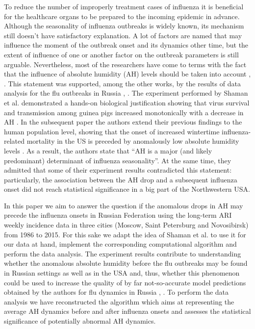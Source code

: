 \documentclass[procedia]{easychair}
\begin{document}
To reduce the number of improperly treatment cases of influenza it is beneficial for the healthcare organs to be prepared to the incoming epidemic in advance.  Although the seasonality of influenza outbreaks is widely known, its mechanism still doesn't have satisfactory explanation. A lot of factors are named that may influence the moment of the outbreak onset and its dynamics other time, but the extent of influence of one or another factor on the outbreak parameters is still  arguable. Nevertheless, most of the researchers have come to terms with the fact that the influence of absolute humidity (AH) levels should be taken into account \cite{tamerius2011global}, \cite{van2012role}. This statement was supported, among the other works, by the results of data analysis for the flu outbreaks in Russia \cite{romanyukha2011origin}, \cite{Leonenko2016}. The experiment performed by Shaman et al. demonstrated a hands-on biological justification showing that virus survival and transmission among guinea pigs increased monotonically with a decrease in AH \cite{shaman2009absolute}. In the subsequent paper the authors extend their previous findings to the human population level, showing that the onset of increased wintertime influenza-related mortality in the US is preceded by anomalously low absolute humidity levels \cite{shaman2010absolute}. As a result, the authors state that ``AH is a major (and likely predominant) determinant of influenza seasonality''. At the same time, they admitted that some of their experiment results contradicted this statement: particularly, the association between the AH drop and a subsequent influenza onset did not reach statistical significance in a big part of the Northwestern USA.

In this paper we aim to answer the question if the anomalous drops in AH may precede the influenza onsets in Russian Federation using the long-term ARI weekly incidence data in three cities (Moscow, Saint Petersburg and Novosibirsk) from 1986 to 2015. For this sake we adapt the idea of Shaman et al. to use it for our data at hand, implement the corresponding computational algorithm and perform the data analysis. The experiment results contribute to understanding whether the anomalous absolute humidity before the flu outbreaks may be found in Russian settings as well as in the USA and, thus, whether this phenomenon could be used to increase the quality of by far not-so-accurate model predictions obtained by the authors for flu dynamics in Russia \cite{leonenko2016mathbio}, \cite{Leon_Novo_Ong}. To perform the data analysis we have reconstructed the algorithm which aims at representing the average AH dynamics before and after influenza onsets and assesses the statistical significance of potentially abnormal AH dynamics. 
\end{document}
